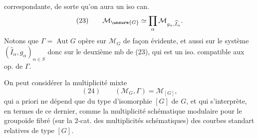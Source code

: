 correspondante,  de sorte qu'on aura un iso can.
\[
(23)\qquad\mathcal M_{\unsure{G}}\simeq\prod_\alpha\mathcal M_{g_\alpha,\widehat I_\alpha}.
\]
Notons que $\Gamma=\operatorname{Aut}G$ opère sur $\mathcal M_G$ de façon évidente, et aussi sur le système $(\widehat I_\alpha,g_\alpha)_{\alpha\in S}$ donc sur le deuxième mb de (23), qui est un iso. compatible aux op. de $\Gamma$.

On peut considérer la multiplicité mixte
\[
(24)\qquad(\mathcal M_G,\Gamma)=\mathcal M_{[G]},
\]
qui a priori ne dépend que du type d'isomorphie $[G]$ de $G$, et qui s'interprète, en termes de ce dernier, comme la multiplicité schématique modulaire pour le groupoïde fibré (sur la $2$-cat. des multiplicités schématiques) des courbes standart relatives de type $[G]$.
